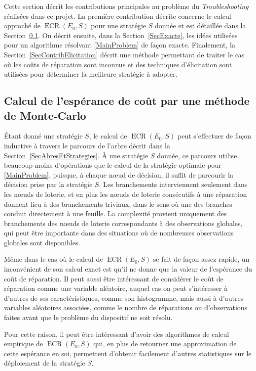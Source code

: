 \documentclass[a4paper,11pt]{article}
\theoremstyle{plain}
\theoremstyle{definition}
\DeclareMathOperator{\ECR}{ECR}
\begin{document}
Cette section décrit les contributions principales au problème du \emph{Troubleshooting} réalisées dans ce projet. La	première contribution décrite concerne le calcul approché de $\ECR(E_0, S)$ pour une stratégie $S$ donnée et est détaillée dans la Section~\ref{SecCalculMonteCarlo}. On décrit ensuite, dans la Section~\ref{SecExacte}, les idées utilisées pour un algorithme résolvant \eqref{MainProblem} de façon exacte. Finalement, la Section~\ref{SecContribElicitation} décrit une méthode permettant de traiter le cas où les coûts de réparation sont inconnus et des techniques d'élicitation sont utilisées pour déterminer la meilleure stratégie à adopter.

\subsection{Calcul de l'espérance de coût par une méthode de Monte-Carlo}
\label{SecCalculMonteCarlo}

Étant donné une stratégie $S$, le calcul de $\ECR(E_0, S)$ peut s'effectuer de façon inductive à travers le parcours de l'arbre décrit dans la Section~\ref{SecAbresEtStrategies}. À une stratégie $S$ donnée, ce parcours utilise beaucoup moins d'opérations que le calcul de la stratégie optimale pour \eqref{MainProblem}, puisque, à chaque nœud de décision, il suffit de parcourir la décision prise par la stratégie $S$. Les branchements interviennent seulement dans les nœuds de loterie, et en plus les nœuds de loterie consécutifs à une réparation donnent lieu à des branchements triviaux, dans le sens où une des branches conduit directement à une feuille. La complexité provient uniquement des branchements des nœuds de loterie correspondants à des observations globales, qui peut être importante dans des situations où de nombreuses observations globales sont disponibles.

Même dans le cas où le calcul de $\ECR(E_0, S)$ se fait de façon assez rapide, un inconvénient de son calcul exact est qu'il ne donne que la valeur de l'espérance du coût de réparation. Il peut aussi être intéressant de considérer le coût de réparation comme une variable aléatoire, auquel cas on peut s'intéresser à d'autres de ses caractéristiques, comme son histogramme, mais aussi à d'autres variables aléatoires associées, comme le nombre de réparations ou d'observations faites avant que le problème du dispositif ne soit résolu.

Pour cette raison, il peut être intéressant d'avoir des algorithmes de calcul empirique de $\ECR(E_0, S)$ qui, en plus de retourner une approximation de cette espérance en soi, permettent d'obtenir facilement d'autres statistiques sur le déploiement de la stratégie $S$.
\end{document}
